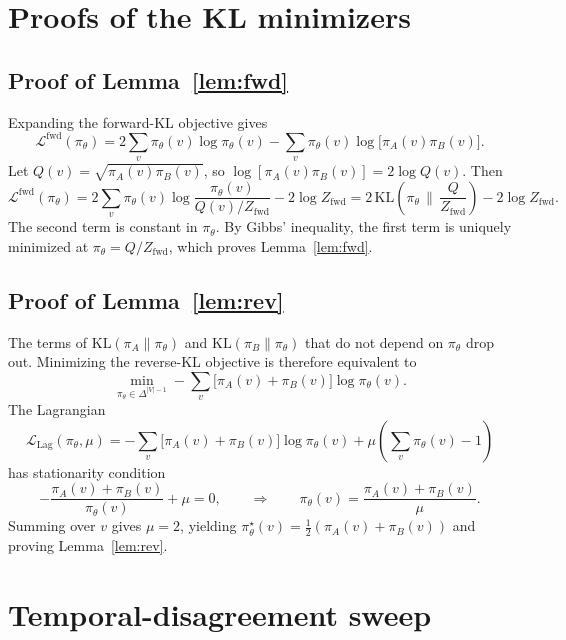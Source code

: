 \documentclass{article}
\begin{document}
% 
% 

\newpage
\appendix

\section{Proofs of the KL minimizers}
\label{app:kl-proofs}

\subsection{Proof of Lemma~\ref{lem:fwd}}

Expanding the forward-KL objective gives
\[
\mathcal{L}^{\mathrm{fwd}}(\pi_\theta)
=
2\sum_v\pi_\theta(v)\log\pi_\theta(v)
-
\sum_v\pi_\theta(v)\log\bigl[\pi_A(v)\pi_B(v)\bigr].
\]
Let $Q(v)=\sqrt{\pi_A(v)\pi_B(v)}$, so
$\log[\pi_A(v)\pi_B(v)]=2\log Q(v)$. Then
\[
\mathcal{L}^{\mathrm{fwd}}(\pi_\theta)
=
2\sum_v\pi_\theta(v)
\log\frac{\pi_\theta(v)}{Q(v)/Z_{\mathrm{fwd}}}
-
2\log Z_{\mathrm{fwd}}
=
2\,\mathrm{KL}\!\left(
\pi_\theta\,\Big\|\,\frac{Q}{Z_{\mathrm{fwd}}}
\right)
-
2\log Z_{\mathrm{fwd}}.
\]
The second term is constant in $\pi_\theta$. By Gibbs' inequality, the first
term is uniquely minimized at
$\pi_\theta=Q/Z_{\mathrm{fwd}}$, which proves Lemma~\ref{lem:fwd}.

\subsection{Proof of Lemma~\ref{lem:rev}}

The terms of $\mathrm{KL}(\pi_A\|\pi_\theta)$ and
$\mathrm{KL}(\pi_B\|\pi_\theta)$ that do not depend on $\pi_\theta$ drop out.
Minimizing the reverse-KL objective is therefore equivalent to
\[
\min_{\pi_\theta\in\Delta^{|V|-1}}
-
\sum_v\bigl[\pi_A(v)+\pi_B(v)\bigr]\log\pi_\theta(v).
\]
The Lagrangian
\[
\mathcal{L}_{\mathrm{Lag}}(\pi_\theta,\mu)
=
-
\sum_v\bigl[\pi_A(v)+\pi_B(v)\bigr]\log\pi_\theta(v)
+
\mu\left(\sum_v\pi_\theta(v)-1\right)
\]
has stationarity condition
\[
-
\frac{\pi_A(v)+\pi_B(v)}{\pi_\theta(v)}
+
\mu
=
0,
\qquad\Longrightarrow\qquad
\pi_\theta(v)
=
\frac{\pi_A(v)+\pi_B(v)}{\mu}.
\]
Summing over $v$ gives $\mu=2$, yielding
$\pi_\theta^\star(v)=\tfrac12(\pi_A(v)+\pi_B(v))$ and proving
Lemma~\ref{lem:rev}.

\section{Temporal-disagreement sweep}
\label{app:temporal-sweep}
\end{document}
